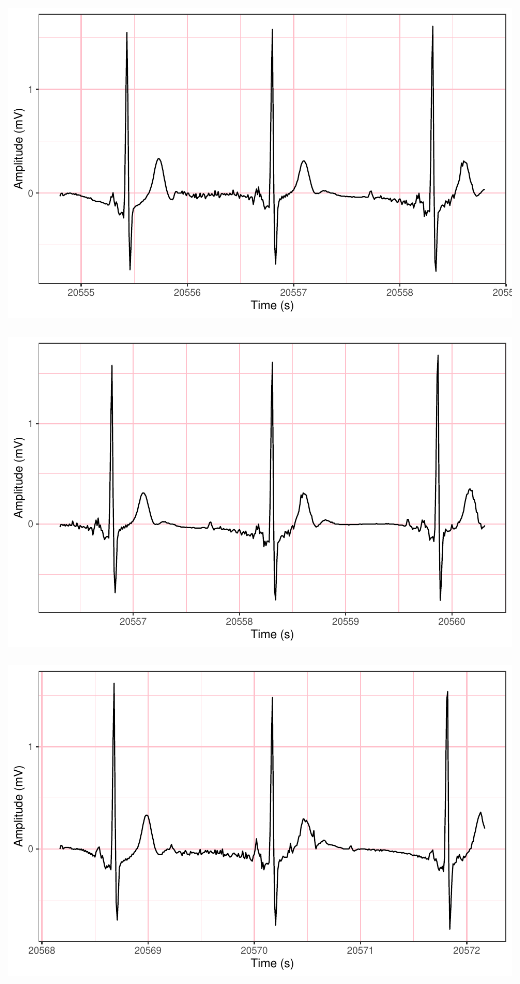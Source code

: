 \documentclass[
]{article}
\begin{document}
\begin{center}\includegraphics{report_files/figure-latex/abnormal-interval-48} \end{center}

\begin{center}\includegraphics{report_files/figure-latex/abnormal-interval-49} \end{center}

\begin{center}\includegraphics{report_files/figure-latex/abnormal-interval-50} \end{center}
\end{document}
